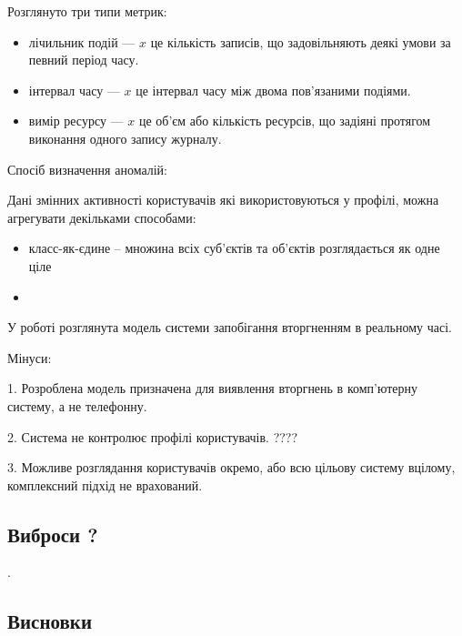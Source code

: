 Розглянуто три типи метрик:

\begin{itemize}
  \item лічильник подій --- $x$ це кількість записів, що задовільняють деякі
  		умови за певний період часу.
  \item інтервал часу --- $x$ це інтервал часу між двома пов'язаними подіями.
  \item вимір ресурсу --- $x$ це об'єм або кількість ресурсів, що задіяні
  		протягом виконання одного запису журналу.
\end{itemize}

Спосіб визначення аномалій:

    Дані змінних активності користувачів які використовуються у профілі, можна
    агрегувати декільками способами: %

\begin{itemize}
  \item класс-як-єдине -- множина всіх суб'єктів та об'єктів розглядається як 
  одне ціле
  \item \TBD
\end{itemize}

    У роботі  розглянута модель системи запобігання вторгненням в реальному часі.

	Мінуси:

	1. Розроблена модель призначена для виявлення вторгнень в комп'ютерну 
	систему, а не телефонну.

	2. Система не контролює профілі користувачів. ???? %

	3. Можливе розглядання користувачів окремо, або всю цільову систему вцілому,
	комплексний підхід не врахований. \TBD

\subsection{Виброси ? \TBD}
    \TBD \cite{ben2005outlier}.


\newpage
\subsection*{Висновки}
    \TBD
